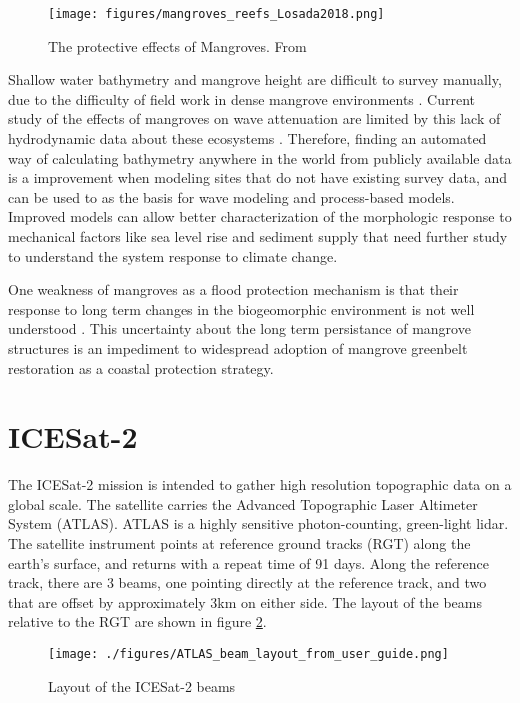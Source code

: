 \begin{figure}[htbp]
      \centering
      \texttt{[image: figures/mangroves\_reefs\_Losada2018.png]}
      \caption{The protective effects of Mangroves. From \parencite{Losada2018}}
      \label{mangrove-protection-diagram}
\end{figure}

Shallow water bathymetry and mangrove height are difficult to survey manually, due to the difficulty of field work in dense mangrove environments \parencite{Gijsman2021}. Current study of the effects of mangroves on wave attenuation are limited by this lack of hydrodynamic data about these ecosystems \parencite{Horstman2014}.  Therefore, finding an automated way of calculating bathymetry anywhere in the world from publicly available data is a improvement when modeling sites that do not have existing survey data, and can be used to as the basis for wave modeling and process-based models. Improved models can allow better characterization of the morphologic response to mechanical factors like sea level rise and sediment supply that need further study to understand the system response to climate change.

One weakness of mangroves as a flood protection mechanism is that their response to long term changes in the biogeomorphic environment is not well understood \parencite{Gijsman2021}. This uncertainty about the long term persistance of mangrove structures is an impediment to widespread adoption of mangrove greenbelt restoration as a coastal protection strategy.

\section{ICESat-2}

The ICESat-2 mission is intended to gather high resolution topographic data on a global scale. The satellite carries the Advanced Topographic Laser Altimeter System (ATLAS). ATLAS is a highly sensitive photon-counting, green-light lidar. The satellite instrument points at reference ground tracks (RGT) along the earth's surface, and returns with a repeat time of 91 days. Along the reference track, there are 3 beams, one pointing directly at the reference track, and two that are offset by approximately 3km on either side. The layout of the beams relative to the RGT are shown in figure \ref{fig:icesat-rgts}.

\begin{figure}[h!]
      \centering
      \texttt{[image: ./figures/ATLAS\_beam\_layout\_from\_user\_guide.png]}
      \caption{Layout of the ICESat-2 beams}
      \label{fig:icesat-rgts}
\end{figure}

